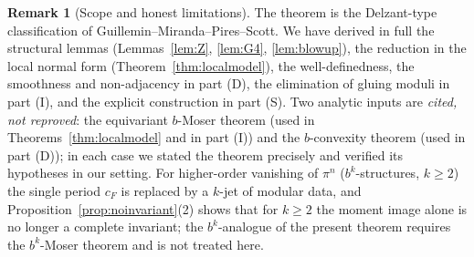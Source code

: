 \documentclass{amsart}
\theoremstyle{definition}
\newtheorem{remark}{Remark}
\begin{document}
\begin{remark}[Scope and honest limitations]
The theorem is the Delzant-type classification of
Guillemin--Miranda--Pires--Scott. We have derived in full the structural
lemmas (Lemmas~\ref{lem:Z}, \ref{lem:G4}, \ref{lem:blowup}), the reduction in
the local normal form (Theorem~\ref{thm:localmodel}), the well-definedness,
the smoothness and non-adjacency in part (D), the elimination of gluing moduli
in part (I), and the explicit construction in part (S). Two analytic inputs are
\emph{cited, not reproved}: the equivariant $b$-Moser theorem (used in
Theorems~\ref{thm:localmodel} and in part (I)) and the $b$-convexity theorem
(used in part (D)); in each case we stated the theorem precisely and verified
its hypotheses in our setting. For higher-order vanishing of $\pi^n$
($b^k$-structures, $k\ge2$) the single period $c_F$ is replaced by a $k$-jet of
modular data, and Proposition~\ref{prop:noinvariant}(2) shows that for $k\ge2$
the moment image alone is no longer a complete invariant; the $b^k$-analogue of
the present theorem requires the $b^k$-Moser theorem and is not treated here.
\end{remark}
\end{document}
